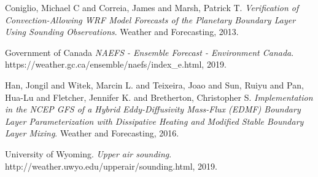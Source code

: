 \documentclass[12pt]{article}
\begin{document}
\pagebreak

\begin{thebibliography}{}
\singlespacing

Coniglio, Michael C and Correia, James and Marsh, Patrick T. 
\textit{Verification of Convection-Allowing WRF Model Forecasts of the Planetary Boundary Layer Using Sounding Observations}. 
Weather and Forecasting, 2013.

Government of Canada
\textit{NAEFS - Ensemble Forecast - Environment Canada}. 
https://weather.gc.ca/ensemble/naefs/index{\_}e.html, 2019.

Han, Jongil and Witek, Marcin L. and Teixeira, Joao and Sun, Ruiyu and Pan, Hua-Lu and Fletcher, Jennifer K. and Bretherton, Christopher S.
\textit{Implementation in the NCEP GFS of a Hybrid Eddy-Diffusivity Mass-Flux (EDMF) Boundary Layer Parameterization with Dissipative Heating and Modified Stable Boundary Layer Mixing}. 
Weather and Forecasting, 2016.

University of Wyoming.
\textit{Upper air sounding}. 
http://weather.uwyo.edu/upperair/sounding.html, 2019.


\end{thebibliography}
\end{document}
